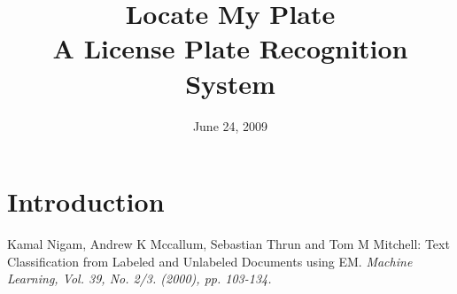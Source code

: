 \documentclass[a4paper,11pt]{article}
\title{Locate My Plate \\ A License Plate Recognition System}
\date{June 24, 2009}
\begin{document}
\maketitle
\section*{Introduction}



\begin{thebibliography}{9}
Kamal Nigam, Andrew K Mccallum, Sebastian Thrun and Tom M Mitchell:
Text Classification from Labeled and Unlabeled Documents using EM.
\emph{Machine Learning, Vol. 39, No. 2/3. (2000), pp. 103-134.}
\end{thebibliography}
\end{document}

